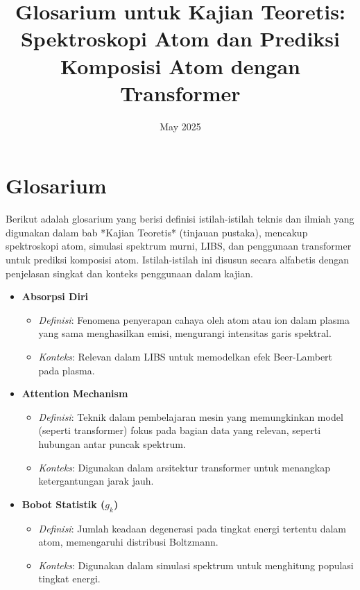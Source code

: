 \documentclass[a4paper,12pt]{article}
\title{Glosarium untuk Kajian Teoretis: Spektroskopi Atom dan Prediksi Komposisi Atom dengan Transformer}
\author{}
\date{May 2025}
\begin{document}
\maketitle

\section{Glosarium}
Berikut adalah glosarium yang berisi definisi istilah-istilah teknis dan ilmiah yang digunakan dalam bab *Kajian Teoretis* (tinjauan pustaka), mencakup spektroskopi atom, simulasi spektrum murni, LIBS, dan penggunaan transformer untuk prediksi komposisi atom. Istilah-istilah ini disusun secara alfabetis dengan penjelasan singkat dan konteks penggunaan dalam kajian.

\begin{itemize}
    \item \textbf{Absorpsi Diri}  
        \begin{itemize}
            \item \textit{Definisi}: Fenomena penyerapan cahaya oleh atom atau ion dalam plasma yang sama menghasilkan emisi, mengurangi intensitas garis spektral.
            \item \textit{Konteks}: Relevan dalam LIBS untuk memodelkan efek Beer-Lambert pada plasma.
        \end{itemize}

    \item \textbf{Attention Mechanism}  
        \begin{itemize}
            \item \textit{Definisi}: Teknik dalam pembelajaran mesin yang memungkinkan model (seperti transformer) fokus pada bagian data yang relevan, seperti hubungan antar puncak spektrum.
            \item \textit{Konteks}: Digunakan dalam arsitektur transformer untuk menangkap ketergantungan jarak jauh.
        \end{itemize}

    \item \textbf{Bobot Statistik (\(g_k\))}  
        \begin{itemize}
            \item \textit{Definisi}: Jumlah keadaan degenerasi pada tingkat energi tertentu dalam atom, memengaruhi distribusi Boltzmann.
            \item \textit{Konteks}: Digunakan dalam simulasi spektrum untuk menghitung populasi tingkat energi.
        \end{itemize}


\end{itemize}
\end{document}
